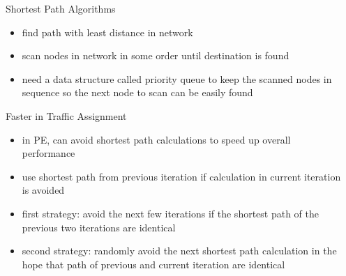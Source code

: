 \documentclass[final]{beamer}
\begin{document}
\begin{frame}{ }
\begin{columns}[t]
\begin{column}{.28\linewidth}
            \begin{block}{Shortest Path Algorithms}
                \begin{itemize}
                    \itemsep.5em
                    \item find path with least distance in network
                    \item scan nodes in network in some order until destination is found
                    \item need a data structure called \alert{priority queue} to keep the scanned nodes in sequence so the next node to scan can be easily found
                \end{itemize}
            \end{block}

            \hspace{25em}

            \begin{block}{Faster in Traffic Assignment}
                \begin{itemize}
                    \itemsep.5em
                    \item in PE, can \alert{avoid} shortest path calculations to speed up overall performance
                    \item use shortest path from previous iteration if calculation in current iteration is avoided
                    \item first strategy: avoid the \alert{next few} iterations if the shortest path of the \alert{previous two} iterations are \alert{identical}
                    \item second strategy: \alert{randomly} avoid the next shortest path calculation in the hope that path of \alert{previous and current} iteration are \alert{identical}
                \end{itemize}
            \end{block}

        \end{column}
        \begin{column}{.4\linewidth}


\end{column}
\end{columns}
\end{frame}
\end{document}
